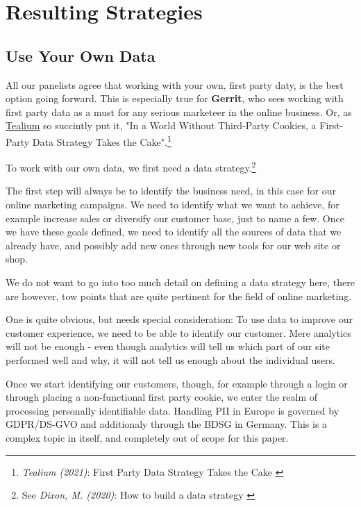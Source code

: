%
%

\pagebreak
\section{Resulting Strategies}

\onehalfspacing

\subsection{Use Your Own Data}

All our panelists agree that working with your own, first party daty, is the best option going forward. This is especially true for \textbf{Gerrit}, who sees working with first party data as a must for any serious marketeer in the online business. Or, as \href{https://tealium.com/}{Tealium} so succintly put it, "In a World Without Third-Party Cookies, a First-Party Data Strategy Takes the Cake".\footnote{\textit{Tealium (2021)}: First Party Data Strategy Takes the Cake \cite{firstCake}}

To work with our own data, we first need a data strategy.\footnote{See \textit{Dixon, M. (2020)}: How to build a data strategy \cite{dataStrategy}}

The first step will always be to identify the business need, in this case for our online marketing campaigns. We need to identify what we want to achieve, for example increase sales or diversify our customer base, just to name a few. Once we have these goals defined, we need to identify all the sources of data that we already have, and possibly add new ones through new tools for our web site or shop.

We do not want to go into too much detail on defining a data strategy here, there are however, tow points that are quite pertinent for the field of online marketing.

One is quite obvious, but needs special consideration: To use data to improve our customer experience, we need to be able to identify our customer. Mere analytics will not be enough - even though analytics will tell us which part of our site performed well and why, it will not tell us enough about the individual users.

Once we start identifying our customers, though, for example through a login or through placing a non-functional first party cookie, we enter the realm of processing personally identifiable data. Handling PII in Europe is governed by GDPR/DS-GVO and additionaly through the BDSG in Germany. This is a complex topic in itself, and completely out of scope for this paper.

